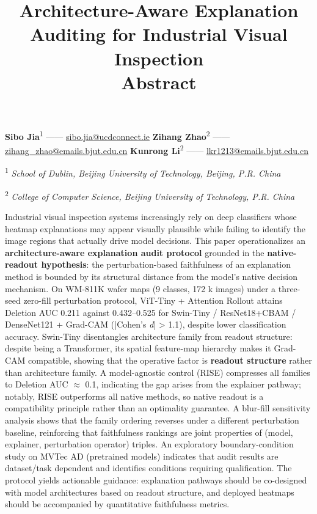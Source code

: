 \documentclass[11pt,a4paper]{article}
\title{Architecture-Aware Explanation Auditing for Industrial Visual Inspection \\ \large Abstract}
\author{}
\date{}
\begin{document}
\maketitle
\thispagestyle{empty}


\textbf{Sibo Jia}\textsuperscript{1} ------ \href{mailto:first.author@example.com}{sibo.jia@ucdconnect.ie} \textbf{Zihang Zhao}\textsuperscript{2} ------ \href{mailto:zihang_zhao@emails.bjut.edu.cn}{zihang\_zhao@emails.bjut.edu.cn} \textbf{Kunrong Li}\textsuperscript{2} ------ \href{mailto:lkr1213@emails.bjut.edu.cn}{lkr1213@emails.bjut.edu.cn}

\textsuperscript{1} \emph{School of Dublin, Beijing University of Technology, Beijing, P.R. China}

\textsuperscript{2} \emph{College of Computer Science, Beijing University of Technology, P.R. China}


Industrial visual inspection systems increasingly rely on deep classifiers whose heatmap explanations may appear visually plausible while failing to identify the image regions that actually drive model decisions. This paper operationalizes an \textbf{architecture-aware explanation audit protocol} grounded in the \textbf{native-readout hypothesis}: the perturbation-based faithfulness of an explanation method is bounded by its structural distance from the model's native decision mechanism. On WM-811K wafer maps (9 classes, 172 k images) under a three-seed zero-fill perturbation protocol, ViT-Tiny + Attention Rollout attains Deletion AUC 0.211 against 0.432--0.525 for Swin-Tiny / ResNet18+CBAM / DenseNet121 + Grad-CAM (|Cohen's \emph{d}| > 1.1), despite lower classification accuracy. Swin-Tiny disentangles architecture family from readout structure: despite being a Transformer, its spatial
feature-map hierarchy makes it Grad-CAM compatible, showing that the operative factor is \textbf{readout structure} rather than architecture family. A model-agnostic control (RISE) compresses all families to Deletion AUC $\approx$ 0.1, indicating the gap arises from the explainer pathway; notably, RISE outperforms all native methods, so native readout is a compatibility principle rather than an optimality guarantee. A blur-fill sensitivity analysis shows that the family ordering reverses under a different perturbation baseline, reinforcing that faithfulness rankings are joint properties of (model, explainer, perturbation operator) triples. An exploratory boundary-condition study on MVTec AD (pretrained models) indicates that audit results are dataset/task dependent and identifies conditions requiring qualification. The protocol yields actionable guidance: explanation pathways should be
co-designed with model architectures based on readout structure, and deployed heatmaps should be accompanied by quantitative faithfulness metrics.
\end{document}
